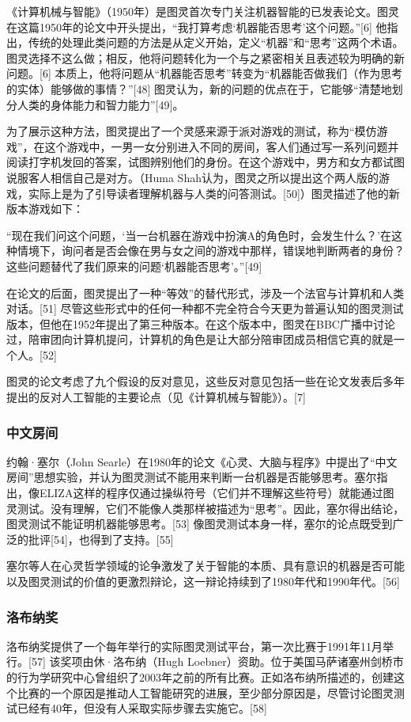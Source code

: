 《计算机械与智能》（1950年）是图灵首次专门关注机器智能的已发表论文。图灵在这篇1950年的论文中开头提出，“我打算考虑‘机器能否思考’这个问题。”[6] 他指出，传统的处理此类问题的方法是从定义开始，定义“机器”和“思考”这两个术语。图灵选择不这么做；相反，他将问题转化为一个与之紧密相关且表述较为明确的新问题。[6] 本质上，他将问题从“机器能否思考”转变为“机器能否做我们（作为思考的实体）能够做的事情？”[48] 图灵认为，新的问题的优点在于，它能够“清楚地划分人类的身体能力和智力能力”[49]。

为了展示这种方法，图灵提出了一个灵感来源于派对游戏的测试，称为“模仿游戏”，在这个游戏中，一男一女分别进入不同的房间，客人们通过写一系列问题并阅读打字机发回的答案，试图辨别他们的身份。在这个游戏中，男方和女方都试图说服客人相信自己是对方。（Huma Shah认为，图灵之所以提出这个两人版的游戏，实际上是为了引导读者理解机器与人类的问答测试。[50]）图灵描述了他的新版本游戏如下：

“现在我们问这个问题，‘当一台机器在游戏中扮演A的角色时，会发生什么？’在这种情境下，询问者是否会像在男与女之间的游戏中那样，错误地判断两者的身份？这些问题替代了我们原来的问题‘机器能否思考’。”[49]

在论文的后面，图灵提出了一种“等效”的替代形式，涉及一个法官与计算机和人类对话。[51] 尽管这些形式中的任何一种都不完全符合今天更为普遍认知的图灵测试版本，但他在1952年提出了第三种版本。在这个版本中，图灵在BBC广播中讨论过，陪审团向计算机提问，计算机的角色是让大部分陪审团成员相信它真的就是一个人。[52]

图灵的论文考虑了九个假设的反对意见，这些反对意见包括一些在论文发表后多年提出的反对人工智能的主要论点（见《计算机械与智能》）。[7]
\subsubsection{中文房间}  
约翰·塞尔（John Searle）在1980年的论文《心灵、大脑与程序》中提出了“中文房间”思想实验，并认为图灵测试不能用来判断一台机器是否能够思考。塞尔指出，像ELIZA这样的程序仅通过操纵符号（它们并不理解这些符号）就能通过图灵测试。没有理解，它们不能像人类那样被描述为“思考”。因此，塞尔得出结论，图灵测试不能证明机器能够思考。[53] 像图灵测试本身一样，塞尔的论点既受到广泛的批评[54]，也得到了支持。[55]

塞尔等人在心灵哲学领域的论争激发了关于智能的本质、具有意识的机器是否可能以及图灵测试的价值的更激烈辩论，这一辩论持续到了1980年代和1990年代。[56]
\subsubsection{洛布纳奖}  
洛布纳奖提供了一个每年举行的实际图灵测试平台，第一次比赛于1991年11月举行。[57] 该奖项由休·洛布纳（Hugh Loebner）资助。位于美国马萨诸塞州剑桥市的行为学研究中心曾组织了2003年之前的所有比赛。正如洛布纳所描述的，创建这个比赛的一个原因是推动人工智能研究的进展，至少部分原因是，尽管讨论图灵测试已经有40年，但没有人采取实际步骤去实施它。[58]

